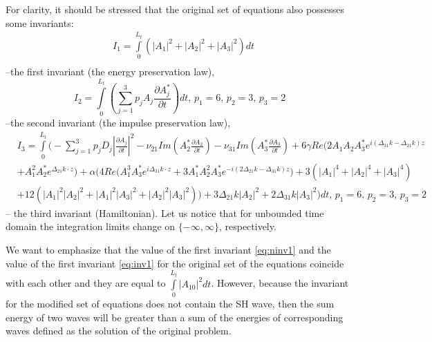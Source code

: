 \documentclass[a4paper, 12pt, onecolumn]{extarticle}
\begin{document}
For clarity, it should be stressed that the original set of equations also possesses some invariants:
\begin{equation}
\label{eq:inv1}
\begin{aligned}
&I_1=\int\limits_0^{L_t}\left(|A_1|^2+|A_2|^2+|A_3|^2\right)dt\\
\end{aligned}
\end{equation}
--the first invariant (the energy preservation law),
\begin{equation}
I_2=\int\limits_0^{L_t}\left(\sum\limits_{j=1}^3 p_j A_j \frac{\partial A_j^*}{\partial t}\right)dt,\,p_1=6,\, p_2=3,\, p_3=2
\end{equation}
--the second invariant (the impulse preservation law),
\begin{equation}
\label{eq:inv3}
\begin{aligned}
&I_3=\int\limits_0^{L_t}\Big(-\sum\limits_{j=1}^3 p_jD_j |\frac{\partial A_j}{\partial t}|^2-\nu_{21}Im\left(A_2^*\frac{\partial A_2}{\partial t}\right)-\nu_{31}Im\left(A_3^*\frac{\partial A_3}{\partial t}\right)+6\gamma Re\bigl(2A_1 A_2 A_3^*e^{i(\Delta_{31}k-\Delta_{21}k)z}\\
&+A_1^2 A_2^*e^{\Delta_{21}k\cdot z}\bigr)+\alpha\big(4Re\bigl({A_1^3}{A_3^*}e^{i\Delta_{31}k\cdot z}+3{A_1^*}{A_2^2}{A_3^*}e^{-i(2\Delta_{21}k-\Delta_{31}k)z}\bigr)+3({|A_1|^4}+{|A_2|^4}+{|A_3|^4})\\
&+12({|A_1|^2}{|A_2|^2}+{|A_1|^2}{|A_3|^2}+{|A_2|^2}{|A_3|^2}))+3\Delta_{21} k|A_2|^2+2\Delta_{31} k|A_3|^2\Big)dt,\,p_1=6,\, p_2=3,\, p_3=2
\end{aligned}
\end{equation}
-- the third invariant (Hamiltonian). Let us notice that for unbounded time domain the integration limits change on \(\{-\infty,\infty\}\), respectively. 

We want to emphasize that the value of the first invariant \eqref{eq:ninv1} and the value of the first invariant \eqref{eq:inv1} for the original set of the equations coincide with each other and they are equal to \(\int\limits_0^{L_t}|A_{10}|^2dt\). However, because the invariant for the modified set of equations does not contain the SH wave, then the sum energy of two waves will be greater than a sum of the energies of corresponding waves defined as the solution of the original problem.
\end{document}
